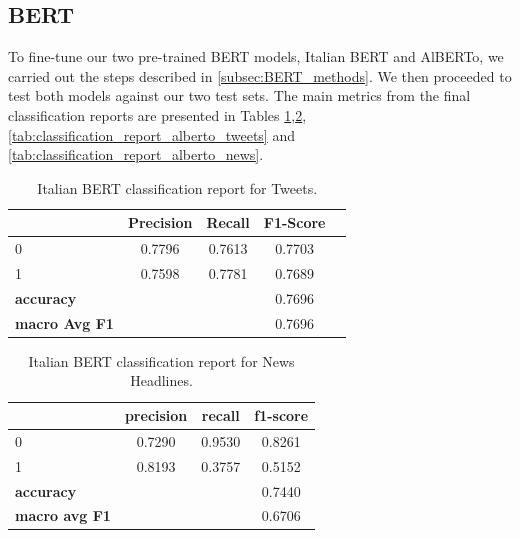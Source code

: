 \subsection{BERT}
\label{subsec:BERT_results}
To fine-tune our two pre-trained BERT models, Italian BERT and AlBERTo, we carried out the steps described in \ref{subsec:BERT_methods}. We then proceeded to test both models against our two test sets. The main metrics from the final classification reports are presented in Tables \ref{tab:classification_report_bert_base_tweets},\ref{tab:classification_report_bert_base_news},\ref{tab:classification_report_alberto_tweets} and \ref{tab:classification_report_alberto_news}.

\begin{table}[h]
    \centering
    \small
    \begin{tabular}{lcccc}
        \toprule
        & \textbf{Precision} & \textbf{Recall} & \textbf{F1-Score} \\
        \midrule
        0 & 0.7796 & 0.7613 & 0.7703 \\
        1 & 0.7598 & 0.7781 & 0.7689 \\
        \midrule
        \textbf{accuracy} & & & 0.7696 \\
        \textbf{macro Avg F1} &  &  & 0.7696 \\
        \bottomrule
    \end{tabular}
    \caption{Italian BERT classification report for Tweets.}
    \label{tab:classification_report_bert_base_tweets}
\end{table}

\begin{table}[h]
    \centering
    \small
    \begin{tabular}{lccc}
        \toprule
        & \textbf{precision} & \textbf{recall} & \textbf{f1-score} \\
        \midrule
        0 & 0.7290 & 0.9530 & 0.8261 \\
        1 & 0.8193 & 0.3757 & 0.5152 \\
        \midrule
        \textbf{accuracy} & & & 0.7440 \\
        \textbf{macro avg F1} & & & 0.6706 \\
        \bottomrule
    \end{tabular}
    \caption{Italian BERT classification report for News Headlines.}
    \label{tab:classification_report_bert_base_news}
\end{table}

